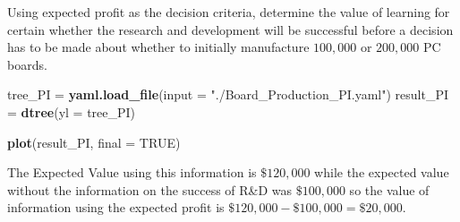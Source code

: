 \documentclass[]{article}
\newenvironment{Shaded}{\begin{snugshade}}{\end{snugshade}}
\newcommand{\KeywordTok}[1]{\textcolor[rgb]{0.13,0.29,0.53}{\textbf{#1}}}
\newcommand{\DataTypeTok}[1]{\textcolor[rgb]{0.13,0.29,0.53}{#1}}
\newcommand{\StringTok}[1]{\textcolor[rgb]{0.31,0.60,0.02}{#1}}
\newcommand{\OtherTok}[1]{\textcolor[rgb]{0.56,0.35,0.01}{#1}}
\newcommand{\NormalTok}[1]{#1}
\begin{document}
Using expected profit as the decision criteria, determine the value of
learning for certain whether the research and development will be
successful before a decision has to be made about whether to initially
manufacture \(100,000\) or \(200,000\) PC boards.

\begin{Shaded}
\begin{Highlighting}[]
\NormalTok{tree_PI =}\StringTok{ }\KeywordTok{yaml.load_file}\NormalTok{(}\DataTypeTok{input =} \StringTok{"./Board_Production_PI.yaml"}\NormalTok{)}
\NormalTok{result_PI =}\StringTok{ }\KeywordTok{dtree}\NormalTok{(}\DataTypeTok{yl =}\NormalTok{ tree_PI)}


\KeywordTok{plot}\NormalTok{(result_PI, }\DataTypeTok{final =} \OtherTok{TRUE}\NormalTok{)}
\end{Highlighting}
\end{Shaded}

\hypertarget{htmlwidget-a47e42890b0384f79af3}{}

The Expected Value using this information is \(\$120,000\) while the
expected value without the information on the success of R\&D was
\(\$100,000\) so the value of information using the expected profit is
\(\$120,000 - \$100,000 = \$20,000\).
\end{document}
